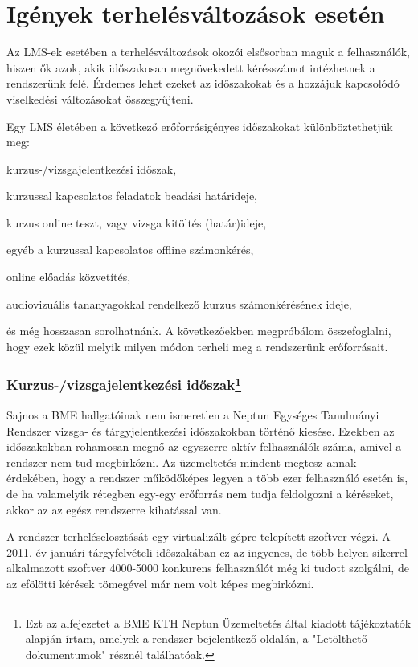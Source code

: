 \section{Igények terhelésváltozások esetén}

Az LMS-ek esetében a terhelésváltozások okozói elsősorban maguk a felhasználók, hiszen ők azok, akik időszakosan megnövekedett kérésszámot intézhetnek a rendszerünk felé. Érdemes lehet ezeket az időszakokat és a hozzájuk kapcsolódó viselkedési változásokat összegyűjteni.

Egy LMS életében a következő erőforrásigényes időszakokat különböztethetjük meg:
\begin{sajat_itemize}
\item kurzus-/vizsgajelentkezési időszak,
\item kurzussal kapcsolatos feladatok beadási határideje,
\item kurzus online teszt, vagy vizsga kitöltés (határ)ideje,
\item egyéb a kurzussal kapcsolatos offline számonkérés,
\item online előadás közvetítés,
\item audiovizuális tananyagokkal rendelkező kurzus számonkérésének ideje, 
\end{sajat_itemize}
és még hosszasan sorolhatnánk. A következőekben megpróbálom összefoglalni, hogy ezek közül melyik milyen módon terheli meg a rendszerünk erőforrásait.

\subsubsection{Kurzus-/vizsgajelentkezési időszak\protect\footnote{Ezt az alfejezetet a BME KTH Neptun Üzemeltetés által kiadott tájékoztatók alapján írtam, amelyek a rendszer bejelentkező oldalán, a "Letölthető dokumentumok" résznél találhatóak.}}

Sajnos a BME hallgatóinak nem ismeretlen a Neptun Egységes Tanulmányi Rendszer vizsga- és tárgyjelentkezési időszakokban történő kiesése. Ezekben az időszakokban rohamosan megnő az egyszerre aktív felhasználók száma, amivel a rendszer nem tud megbirkózni. Az üzemeltetés mindent megtesz annak érdekében, hogy a rendszer működőképes legyen a több ezer felhasználó esetén is, de ha valamelyik rétegben egy-egy erőforrás nem tudja feldolgozni a kéréseket, akkor az az egész rendszerre kihatással van.

A rendszer terheléselosztását egy virtualizált gépre telepített szoftver végzi. A 2011. év januári tárgyfelvételi időszakában ez az ingyenes, de több helyen sikerrel alkalmazott szoftver 4000-5000 konkurens felhasználót még ki tudott szolgálni, de az efölötti kérések tömegével már nem volt képes megbirkózni.

